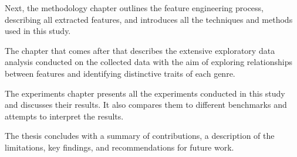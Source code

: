 Next, the methodology chapter outlines the feature engineering process,
describing all extracted features, and introduces all the techniques
and methods used in this study. 

The chapter that comes after that describes the extensive exploratory data
analysis conducted on the collected data with the aim of exploring relationships
between features and identifying distinctive traits of each genre.

The experiments chapter presents all the experiments conducted in this study
and discusses their results. It also compares them to different benchmarks and
attempts to interpret the results.

The thesis concludes with a summary of contributions, a description
of the limitations, key findings, and recommendations for future work. 
